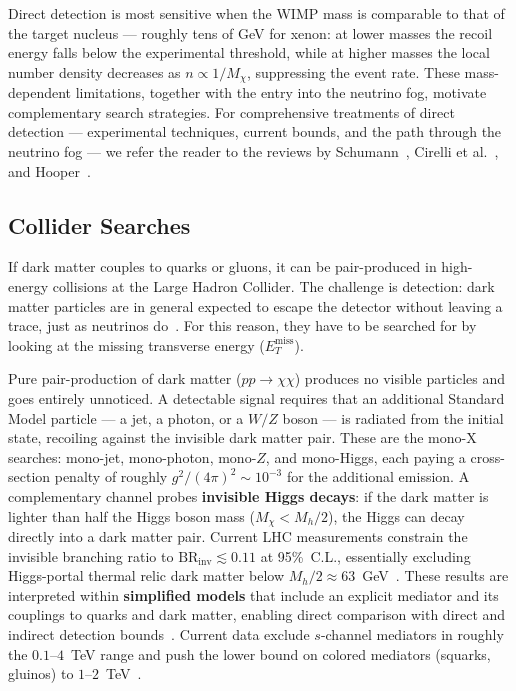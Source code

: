 Direct detection is most sensitive when the WIMP mass is comparable to that of the target nucleus --- roughly tens of GeV for xenon: at lower masses the recoil energy falls below the experimental threshold, while at higher masses the local number density decreases as $n \propto 1/M_\chi$, suppressing the event rate.
These mass-dependent limitations, together with the entry into the neutrino fog, motivate complementary search strategies.
For comprehensive treatments of direct detection --- experimental techniques, current bounds, and the path through the neutrino fog --- we refer the reader to the reviews by Schumann~\cite{Schumann:2019eaa}, Cirelli et al.~\cite{Cirelli:2024ssz}, and Hooper~\cite{Hooper:2024}.

\subsection{Collider Searches}
\label{sec:1.3.2}

If dark matter couples to quarks or gluons, it can be pair-produced in high-energy collisions at the Large Hadron Collider.
The challenge is detection: dark matter particles are in general expected to escape the detector without leaving a trace, just as neutrinos do~\cite{Cirelli:2024ssz}.
For this reason, they have to be searched for by looking at the missing transverse energy ($E_T^\text{miss}$).

Pure pair-production of dark matter ($pp \to \chi\chi$) produces no visible particles and goes entirely unnoticed.
A detectable signal requires that an additional Standard Model particle --- a jet, a photon, or a $W/Z$ boson --- is radiated from the initial state, recoiling against the invisible dark matter pair.
These are the mono-X searches: mono-jet, mono-photon, mono-$Z$, and mono-Higgs, each paying a cross-section penalty of roughly $g^2/(4\pi)^2 \sim 10^{-3}$ for the additional emission.
A complementary channel probes \textbf{invisible Higgs decays}: if the dark matter is lighter than half the Higgs boson mass ($M_\chi < M_h/2$), the Higgs can decay directly into a dark matter pair.
Current LHC measurements constrain the invisible branching ratio to $\text{BR}_\text{inv} \lesssim 0.11$ at 95\%~C.L., essentially excluding Higgs-portal thermal relic dark matter below $M_h/2 \approx 63$~GeV~\cite{ATLAS:2023tkt}.
These results are interpreted within \textbf{simplified models} that include an explicit mediator and its couplings to quarks and dark matter, enabling direct comparison with direct and indirect detection bounds~\cite{Boveia:2018yeb}.
Current data exclude $s$-channel mediators in roughly the $0.1$--$4$~TeV range and push the lower bound on colored mediators (squarks, gluinos) to $1$--$2$~TeV~\cite{Hooper:2024}.

